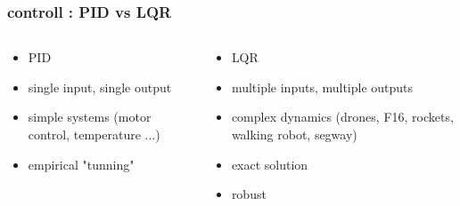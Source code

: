\documentclass{beamer}
\begin{document}
\begin{frame}
\begin{columns}
    \end{columns}

\end{frame}



\begin{frame}
  
  \frametitle{\bf controll : PID vs LQR}    


    \begin{columns}

      \begin{column}{0.5\textwidth}
        \begin{itemize}
          \item PID
          \item single input, single output
          \item simple systems (motor control, temperature ...)
          \item empirical "tunning" 
        \end{itemize}
      \end{column}
  
      \begin{column}{0.5\textwidth}
        \begin{itemize}
          \item LQR
          \item multiple inputs, multiple outputs
          \item complex dynamics (drones, F16, rockets, walking robot, segway)
          \item exact solution
          \item robust
        \end{itemize}
      \end{column}
  
    \end{columns}


\end{frame}
\end{document}
